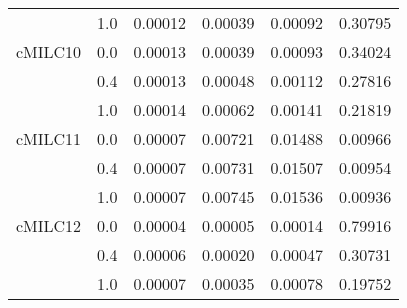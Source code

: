 \begin{longtable}{cccccc}
     & 1.0 & 0.00012 & 0.00039 & 0.00092 & 0.30795 \\
cMILC10 & 0.0 & 0.00013 & 0.00039 & 0.00093 & 0.34024 \\
     & 0.4 & 0.00013 & 0.00048 & 0.00112 & 0.27816 \\
     & 1.0 & 0.00014 & 0.00062 & 0.00141 & 0.21819 \\
cMILC11 & 0.0 & 0.00007 & 0.00721 & 0.01488 & 0.00966 \\
     & 0.4 & 0.00007 & 0.00731 & 0.01507 & 0.00954 \\
     & 1.0 & 0.00007 & 0.00745 & 0.01536 & 0.00936 \\
cMILC12 & 0.0 & 0.00004 & 0.00005 & 0.00014 & 0.79916 \\
     & 0.4 & 0.00006 & 0.00020 & 0.00047 & 0.30731 \\
     & 1.0 & 0.00007 & 0.00035 & 0.00078 & 0.19752 \\
\end{longtable}
